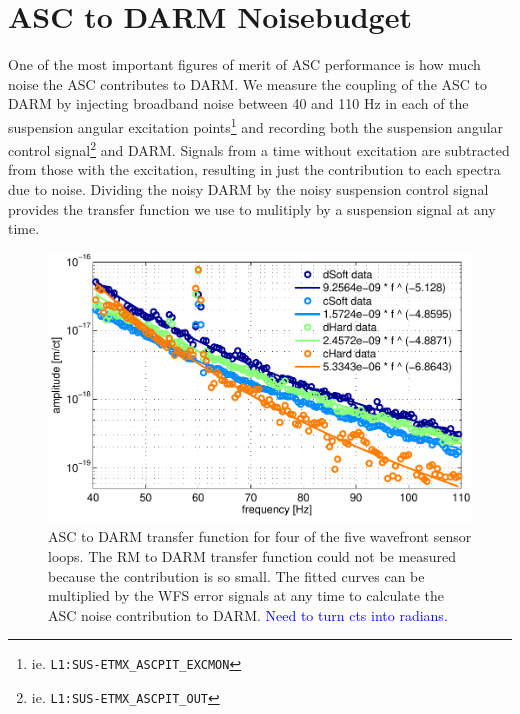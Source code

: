 \section{ASC to DARM Noisebudget}
One of the most important figures of merit of ASC performance is how
much noise the ASC contributes to DARM. We measure the coupling of the
ASC to DARM by injecting broadband noise between 40 and 110 Hz in each
of the suspension angular excitation
points\footnote{ie. \texttt{L1:SUS-ETMX\_ASCPIT\_EXCMON}} and
recording both the suspension angular control
signal\footnote{ie. \texttt{L1:SUS-ETMX\_ASCPIT\_OUT}} and
DARM. Signals from a time without excitation are subtracted from those
with the excitation, resulting in just the contribution to each
spectra due to noise. Dividing the noisy DARM by the noisy suspension
control signal provides the transfer function we use to mulitiply by a
suspension signal at any time.

\begin{figure}
\begin{centering}
\includegraphics[width=1.0\columnwidth]{figures/ASC2DARM_TFs.pdf}
\caption[Measured ASC to DARM transfer functions]{ASC to DARM transfer
  function for four of the five wavefront sensor loops. The RM to DARM
  transfer function could not be measured because the contribution is
  so small. The fitted curves can be multiplied by the WFS error
  signals at any time to calculate the ASC noise contribution to
  DARM. \textcolor{blue}{Need to turn cts into radians.}}
\end{centering}
\end{figure}



